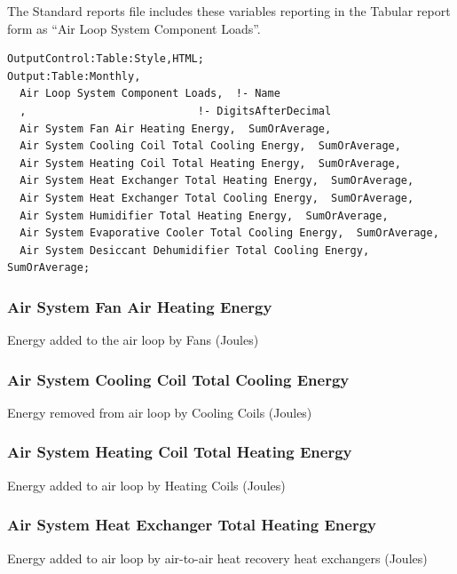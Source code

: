 The Standard reports file includes these variables reporting in the Tabular report form as ``Air Loop System Component Loads''.

\begin{lstlisting}
OutputControl:Table:Style,HTML;
Output:Table:Monthly,
  Air Loop System Component Loads,  !- Name
  ,                           !- DigitsAfterDecimal
  Air System Fan Air Heating Energy,  SumOrAverage,
  Air System Cooling Coil Total Cooling Energy,  SumOrAverage,
  Air System Heating Coil Total Heating Energy,  SumOrAverage,
  Air System Heat Exchanger Total Heating Energy,  SumOrAverage,
  Air System Heat Exchanger Total Cooling Energy,  SumOrAverage,
  Air System Humidifier Total Heating Energy,  SumOrAverage,
  Air System Evaporative Cooler Total Cooling Energy,  SumOrAverage,
  Air System Desiccant Dehumidifier Total Cooling Energy,  SumOrAverage;
\end{lstlisting}

\subsubsection{Air System Fan Air Heating Energy}\label{air-system-fan-air-heating-energy}

Energy added to the air loop by Fans (Joules)

\subsubsection{Air System Cooling Coil Total Cooling Energy}\label{air-system-cooling-coil-total-cooling-energy}

Energy removed from air loop by Cooling Coils (Joules)

\subsubsection{Air System Heating Coil Total Heating Energy}\label{air-system-heating-coil-total-heating-energy}

Energy added to air loop by Heating Coils (Joules)

\subsubsection{Air System Heat Exchanger Total Heating Energy}\label{air-system-heat-exchanger-total-heating-energy}

Energy added to air loop by air-to-air heat recovery heat exchangers (Joules)

